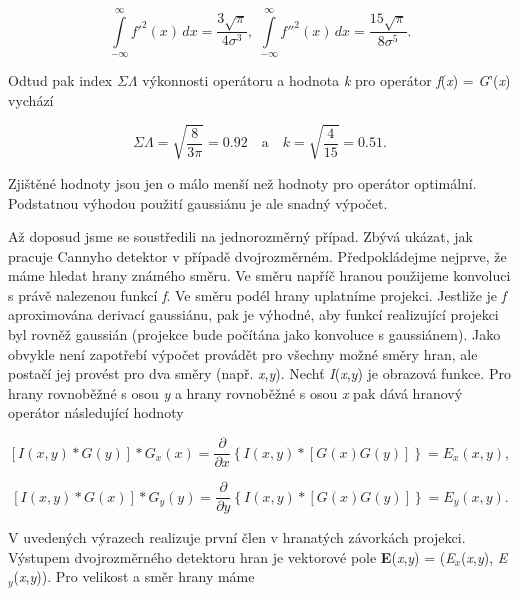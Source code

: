\begin{equation}
    \int\limits_{-\infty}^{\infty} f'^2(x)\,dx = \frac{3\sqrt{\pi}}{4\sigma^3}, \; \int\limits_{-\infty}^{\infty} f''^2(x)\,dx = \frac{15\sqrt{\pi}}{8\sigma^5}.\nonumber
\end{equation}

Odtud pak index $\Sigma\Lambda$ výkonnosti operátoru a hodnota \textit{k} pro operátor \textit{f}(\textit{x}) = \textit{G}'(\textit{x}) vychází

\begin{equation} \label{eq:8_47}
    \Sigma\Lambda = \sqrt{\frac{8}{3\pi}} = 0.92 \quad \mathrm{a} \quad k = \sqrt{\frac{4}{15}} = 0.51.
\end{equation}

Zjištěné hodnoty jsou jen o málo menší než hodnoty pro operátor optimální. Podstatnou výhodou použití gaussiánu je ale snadný výpočet.

Až doposud jsme se soustředili na jednorozměrný případ. Zbývá ukázat, jak pracuje Cannyho detektor v případě dvojrozměrném. Předpokládejme nejprve, že máme hledat hrany známého směru. Ve směru napříč hranou použijeme konvoluci s právě nalezenou funkcí \textit{f}. Ve směru podél hrany uplatníme projekci. Jestliže je \textit{f}  aproximována derivací gaussiánu, pak je výhodné, aby funkcí realizující projekci byl rovněž gaussián (projekce bude počítána jako konvoluce s gaussiánem). Jako obvykle není zapotřebí výpočet provádět pro všechny možné směry hran, ale postačí jej provést pro dva směry (např. \textit{x},\textit{y}). Nechť \textit{I}(\textit{x},\textit{y}) je obrazová funkce. Pro hrany rovnoběžné s osou \textit{y} a hrany rovnoběžné s osou \textit{x} pak dává hranový operátor následující hodnoty

\begin{equation} \label{eq:8_48}
    [ I(x, y) \ast G(y)] \ast G_x(x) = \frac{\partial}{\partial x} \left\{ I(x, y) \ast \left[ G(x)G(y) \right] \right\} = E_x(x, y),
\end{equation}

\begin{equation} \label{eq:8_49}
    [ I(x, y) \ast G(x)] \ast G_y(y) = \frac{\partial}{\partial y} \left\{ I(x, y) \ast \left[ G(x)G(y) \right] \right\} = E_y(x, y).
\end{equation}

V uvedených výrazech realizuje první člen v hranatých závorkách projekci. Výstupem dvojrozměrného detektoru hran je vektorové pole \textbf{E}(\textit{x},\textit{y}) = (\textit{E}$_x$(\textit{x},\textit{y}), \textit{E}$_y$(\textit{x},\textit{y})). Pro velikost a směr hrany máme

